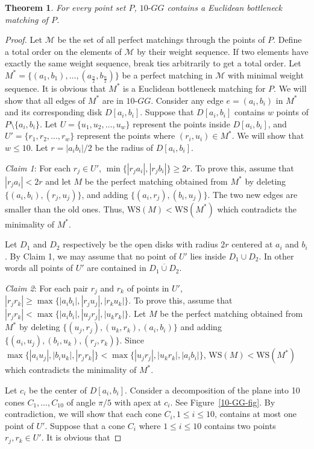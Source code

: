 \documentclass[11pt,a4paper]{article}
\newcommand{\kGG}[2]{$#1\text{-}GG#2$}
\newcommand{\WS}[1]{\text{WS$(#1)$}}
\newcommand{\CD}[2]{D[#1,#2]}
\newtheorem{theorem}{Theorem}
\begin{document}
\begin{theorem}
 \label{10-GG-thr}
For every point set $P$, \kGG{10}{} contains a Euclidean bottleneck matching of $P$.
\end{theorem}
\begin{proof}
Let $\mathcal{M}$ be the set of all perfect matchings through the points of $P$. Define a total order on the elements of $\mathcal{M}$ by their weight sequence. If two elements have exactly the same weight sequence, break ties arbitrarily to get a total order.
Let $M^* = \{(a_1, b_1),\dots, (a_{\frac{n}{2}}, b_{\frac{n}{2}})\}$ be a perfect matching in $\mathcal{M}$ with minimal weight sequence. It is obvious that $M^*$ is a Euclidean bottleneck matching for $P$. We will show that all edges of $M^*$ are in \kGG{10}{}. Consider any edge $e = (a_i, b_i)$ in $M^*$ and its corresponding disk $\CD{a_i}{b_i}$. Suppose that $\CD{a_i}{b_i}$ contains $w$ points of $P\setminus\{a_i,b_i\}$. Let $U = \{u_1, u_2,\dots, u_w\}$ represent the points inside $\CD{a_i}{b_i}$, and $U'=\{r_1, r_2,\dots, r_w\}$ represent the points where $(r_i,u_i)\in M^*$. We will show that $w\le 10$. Let $r=|a_ib_i|/2$ be the radius of $\CD{a_i}{b_i}$. 

{\em Claim 1}: For each $r_j\in U'$, $\min\{|r_ja_i|, |r_jb_i|\} \ge 2r$. To prove this, assume that $|r_ja_i|< 2r$ and let $M$ be the perfect matching obtained from $M^*$ by deleting $\{(a_i,b_i), (r_j,u_j)\}$, and adding $\{(a_i, r_j), (b_i, u_j)\}$. The two new edges are smaller than the old ones. Thus, $\WS{M}<\WS{M^*}$ which contradicts the minimality of $M^*$.

Let $D_1$ and $D_2$ respectively be the open disks with radius $2r$ centered at $a_i$ and $b_i$. By Claim 1, we may assume that no point of $U'$ lies inside $D_1\cup D_2$. In other words all points of $U'$ are contained in $\overline{D_1\cup D_2}$.

{\em Claim 2}: For each pair $r_j$ and $r_k$ of points in $U'$, $|r_jr_k|\ge \allowbreak\max\allowbreak\{|a_ib_i|, \allowbreak |r_ju_j|, \allowbreak |r_ku_k|\}$. To prove this, assume that $|r_jr_k|< \max\{|a_ib_i|, |u_jr_j|,\allowbreak |u_kr_k|\}$. Let $M$ be the perfect matching obtained from $M^*$ by deleting $\{(u_j,r_j),(u_k,r_k),(a_i, b_i)\}$ and adding $\{(a_i, u_j), (b_i, u_k),(r_j, r_k)\}$. Since $\max \{|a_iu_j|,\allowbreak |b_iu_k|,\allowbreak |r_jr_k|\}<\max\{|u_jr_j|,\allowbreak |u_kr_k|,\allowbreak |a_ib_i|\}$, $\WS{M} \allowbreak<\allowbreak \WS{M^*}$ which contradicts the minimality of $M^*$.

Let $c_i$ be the center of $\CD{a_i}{b_i}$. Consider a decomposition of the plane into 10 cones $C_1, \dots, C_{10}$ of angle $\pi/5$ with apex at $c_i$. See Figure~\ref{10-GG-fig}. By contradiction, we will show that each cone $C_i, 1\le i\le 10$, contains at most one point of $U'$. Suppose that a cone $C_i$ where $1\le i\le 10$ contains two points $r_j, r_k\in U'$. It is obvious that 


\end{proof}
\end{document}
